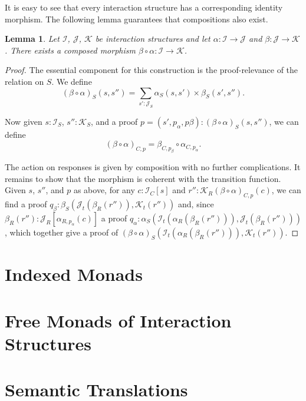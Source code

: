 \documentclass{article}
\newtheorem{lemma}[theorem]{Lemma}
\theoremstyle{definition}
\newcommand{\iss}[1]{\mathcal{#1}_S}
\newcommand{\isc}[1]{\mathcal{#1}_C}
\newcommand{\isr}[1]{\mathcal{#1}_R}
\newcommand{\ist}[1]{\mathcal{#1}_t}
\begin{document}
    It is easy to see that every interaction structure has a corresponding identity morphism.  The following lemma
    guarantees that compositions also exist.

    \begin{lemma}
        Let $\mathcal{I}$, $\mathcal{J}$, $\mathcal{K}$ be interaction structures and let $\alpha : \mathcal{I} \to
        \mathcal{J}$ and $\beta : \mathcal{J} \to \mathcal{K}$.  There exists a composed morphism $\beta \circ \alpha :
        \mathcal{I} \to \mathcal{K}$.
    \end{lemma}

    \begin{proof}
        The essential component for this construction is the proof-relevance of the relation on $S$.  We define
        \[
            (\beta \circ \alpha)_S(s, s'') = \sum_{s' : \iss J} \alpha_S(s, s') \times \beta_S(s', s'').
        \]

        Now given $s : \iss I$, $s'' : \iss K$, and a proof $p = (s', p_\alpha, p\beta) : (\beta \circ \alpha)_S(s, s'')$,
        we can define
        \[
            (\beta \circ \alpha)_{C, p} = \beta_{C, p_\beta} \circ \alpha_{C, p_\alpha}.
        \]

        The action on responses is given by composition with no further complications.  It remains to show that the
        morphism is coherent with the transition function.  Given $s$, $s''$, and $p$ as above, for any $c : \isc I[s]$
        and $r'' : \isr K{(\beta \circ \alpha)_{C, p}(c)}$, we can find a proof $q_\beta : \beta_S(\ist J(\beta_R(r'')),
        \ist K(r''))$ and, since $\beta_R(r'') : \isr J[\alpha_{R, p_\alpha}(c)]$ a proof $q_\alpha :
        \alpha_S(\ist I(\alpha_R(\beta_R(r''))), \ist J(\beta_R(r'')))$, which together give a proof of $(\beta \circ
        \alpha)_S(\ist I(\alpha_R(\beta_R(r''))), \ist K(r''))$.
        
    \end{proof}

    \section{Indexed Monads}

    \section{Free Monads of Interaction Structures}

    \section{Semantic Translations}
\end{document}
